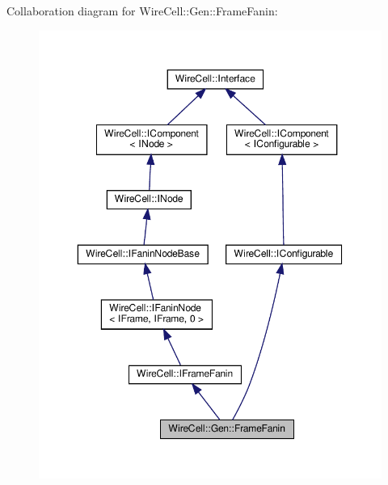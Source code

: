 Collaboration diagram for Wire\+Cell\+:\+:Gen\+:\+:Frame\+Fanin\+:
\nopagebreak
\begin{figure}[H]
\begin{center}
\leavevmode
\includegraphics[width=350pt]{class_wire_cell_1_1_gen_1_1_frame_fanin__coll__graph}
\end{center}
\end{figure}
